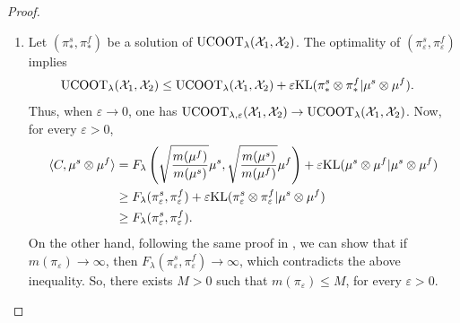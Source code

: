 \begin{proof}
\begin{enumerate}
    \item Let $(\pi_*^s, \pi_*^f)$ be a solution of
    $\text{UCOOT}_{\lambda}(\mathcal X_1, \mathcal X_2)$.
    The optimality of $(\pi_{\varepsilon}^s, \pi_{\varepsilon}^f)$ implies
    \begin{equation}
      \begin{split}
        \text{UCOOT}_{\lambda}(\mathcal X_1, \mathcal X_2)
      &\leq \text{UCOOT}_{\lambda}(\mathcal X_1, \mathcal X_2) +
      \varepsilon \text{KL}(\pi_*^s \otimes \pi_*^f \vert \mu^s \otimes \mu^f).
      \end{split}
    \end{equation}
    Thus, when $\varepsilon \to 0$, one has
    $\text{UCOOT}_{\lambda, \varepsilon}(\mathcal X_1, \mathcal X_2) \to
    \text{UCOOT}_{\lambda}(\mathcal X_1, \mathcal X_2)$. Now, for every $\varepsilon > 0$,
    \begin{equation}
      \begin{split}
        \langle C, \mu^s \otimes \mu^f \rangle &=
        F_{\lambda} \left( \sqrt{\frac{m(\mu^f)}{m(\mu^s)}} \mu^s, \sqrt{\frac{m(\mu^s)}{m(\mu^f)}} \mu^f \right) +
        \varepsilon \text{KL}( \mu^s \otimes \mu^f \vert \mu^s \otimes \mu^f ) \\
        &\geq F_{\lambda}(\pi_{\varepsilon}^s, \pi_{\varepsilon}^f) +
        \varepsilon \text{KL}(\pi_{\varepsilon}^s \otimes \pi_{\varepsilon}^f \vert \mu^s \otimes \mu^f) \\
        &\geq F_{\lambda}(\pi_{\varepsilon}^s, \pi_{\varepsilon}^f).
      \end{split}
    \end{equation}
    On the other hand, following the same proof in ,
    we can show that if
    $m(\pi_{\varepsilon}) \to \infty$, then
    $F_{\lambda}(\pi_{\varepsilon}^s, \pi_{\varepsilon}^f) \to \infty$, which
    contradicts the above inequality. So, there exists $M > 0$ such that
    $m(\pi_{\varepsilon}) \leq M$, for every $\varepsilon > 0$.


\end{enumerate}
\end{proof}
